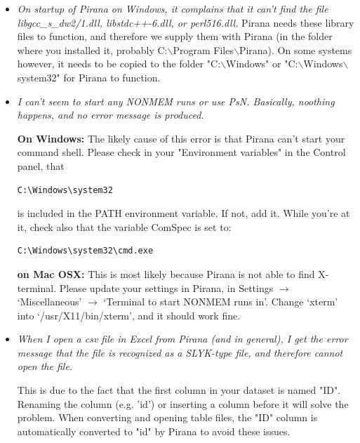 {{{{\begin{itemize}
  \begin{lstlisting}
  perl -MDBI -e 'print "$DBI::VERSION"'
  perl -MDBD::SQLite -e 'print "$DBD::SQLite::VERSION"'
  \end{lstlisting}

\item \textit{On startup of Pirana on Windows, it complains that it
    can't find the file libgcc\_s\_dw2/1.dll, libstdc++-6.dll, or perl516.dll.}
  Pirana needs these library files to function, and therefore we
  supply them with Pirana (in the folder where you installed it,
  probably C:$\backslash$Program Files$\backslash$Pirana). On some
  systems however, it needs to be copied to the folder
  "C:$\backslash$Windows" or
  "C:$\backslash$Windows$\backslash$system32" for Pirana to
  function.

\item \textit{I can't seem to start any NONMEM runs or use PsN. Basically, noothing happens, and no error message is produced.}

 \vspace{5pt} \textbf{On Windows:} The likely cause of this error is that Pirana can't start
your command shell. Please check in your "Environment variables" in
the Control panel, that 

\begin{lstlisting}
C:\Windows\system32
\end{lstlisting} 

is included in the PATH
environment variable. If not, add it. While you're at it, check also
that the variable ComSpec is set to: 

\begin{lstlisting}
C:\Windows\system32\cmd.exe
\end{lstlisting}

 \vspace{5pt} \textbf{on Mac OSX:} This is most likely because Pirana is not able to find X-terminal. Please update your settings in Pirana, in Settings 
 $\rightarrow$ `Miscellaneous'  $\rightarrow$ `Terminal to start NONMEM runs in'. Change `xterm' into `/usr/X11/bin/xterm', and it should work fine.

\item \textit{When I open a csv file in Excel from Pirana (and in
    general), I get the error message that the file is recognized as a
    SLYK-type file, and
    therefore cannot open the file.}

  \vspace{5pt}
  This is due to the fact that the first column in your dataset is
  named "ID". Renaming the column (e.g. 'id') or inserting a column
  before it will solve the problem. When converting and opening table
  files, the "ID" column is automatically converted to "id" by Pirana
  to avoid these issues.


\end{itemize}}}}}
